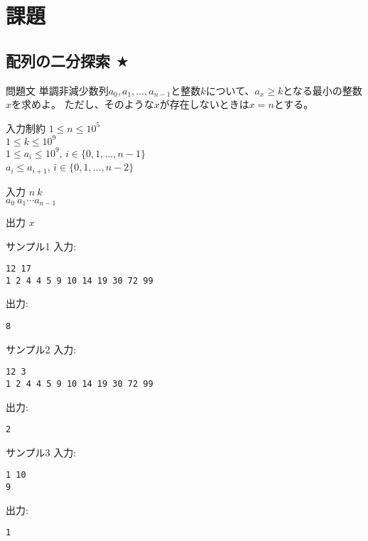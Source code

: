 \documentclass[a4paper,twoside,onecolumn,openany,article,10pt]{memoir}
\theoremstyle{remark}
\begin{document}
\clearpage
\section{課題}\label{sec:assign}
\subsection{配列の二分探索 $\bigstar$}
\begin{itembox}[l]{問題文}
単調非減少数列$a_0, a_1,\dotsc, a_{n-1}$と整数$k$について、$a_x\ge k$となる最小の整数$x$を求めよ。
ただし、そのような$x$が存在しないときは$x=n$とする。
\end{itembox}

\begin{itembox}[l]{入力制約}
$1\le n\le 10^5$\\
$1\le k\le 10^9$\\
$1\le a_i\le 10^9$,\hspace{2em} $i\in\{0,1,\dotsc,n-1\}$\\
$a_i\le a_{i+1}$,\hspace{2em} $i\in\{0,1,\dotsc,n-2\}$
\end{itembox}

\begin{itembox}[l]{入力}
$n~k$\\
$a_0~a_1 \dotsb a_{n-1}$
\end{itembox}

\begin{itembox}[l]{出力}
$x$
\end{itembox}

\begin{itembox}[l]{サンプル1}
入力:
\begin{verbatim}
12 17
1 2 4 4 5 9 10 14 19 30 72 99
\end{verbatim}
出力:
\begin{verbatim}
8
\end{verbatim}
\end{itembox}

\begin{itembox}[l]{サンプル2}
入力:
\begin{verbatim}
12 3
1 2 4 4 5 9 10 14 19 30 72 99
\end{verbatim}
出力:
\begin{verbatim}
2
\end{verbatim}
\end{itembox}

\begin{itembox}[l]{サンプル3}
入力:
\begin{verbatim}
1 10
9
\end{verbatim}
出力:
\begin{verbatim}
1
\end{verbatim}
\end{itembox}
\end{document}
